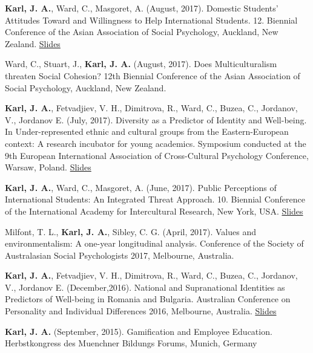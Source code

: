 \documentclass[11pt]{article} %
\begin{document}
\begin{hangparas}{2em}{1}
\textbf{Karl, J. A.}, Ward, C., Masgoret, A. (August, 2017). Domestic Students’ Attitudes Toward and Willingness to Help
International Students. 12. Biennial Conference of the Asian Association of Social Psychology, Auckland, New Zealand. \href{https://osf.io/6p52f/?view_only=0e7a21100916477a8927b55e045d2ec1}{Slides}

Ward, C., Stuart, J., \textbf{Karl, J. A.} (August, 2017). Does Multiculturalism threaten Social Cohesion? 12th Biennial Conference of the Asian Association of Social Psychology, Auckland, New Zealand. 

\textbf{Karl, J. A.}, Fetvadjiev, V. H., Dimitrova, R., Ward, C., Buzea, C., Jordanov, V., Jordanov E. (July, 2017). Diversity as a Predictor of Identity and Well-being. In Under-represented ethnic and cultural groups from the Eastern-European context: A research incubator for young academics. Symposium conducted at the 9th European International Association of Cross-Cultural Psychology Conference, Warsaw, Poland. \href{https://osf.io/wcgpy/?view_only=370e5921cd2f44748e18b4d194630675}{Slides}


\textbf{Karl, J. A.}, Ward, C., Masgoret, A. (June, 2017). Public Perceptions of International Students: An Integrated Threat Approach. 10. Biennial Conference of the International Academy for Intercultural Research, New York, USA. \href{https://osf.io/a7vum/?view_only=84e3457be84e4c5180aeb5968059d061}{Slides}



Milfont, T. L., \textbf{Karl, J. A.}, Sibley, C. G. (April, 2017). Values and environmentalism: A one-year longitudinal analysis. Conference of the Society of Australasian Social Psychologists 2017, Melbourne, Australia.


\textbf{Karl, J. A.}, Fetvadjiev, V. H., Dimitrova, R., Ward, C., Buzea, C., Jordanov, V., Jordanov E. (December,2016). National and Supranational Identities as Predictors of Well-being in Romania and Bulgaria. Australian Conference on Personality and Individual Differences 2016, Melbourne, Australia. \href{https://osf.io/78hx2/?view_only=529e2c2e9f12481794bd17cd2a13cec6}{Slides}

\textbf{Karl, J. A.} (September, 2015). Gamification and Employee Education. Herbstkongress des Muenchner Bildungs Forums, Munich, Germany\\

\end{hangparas}
\end{document}
